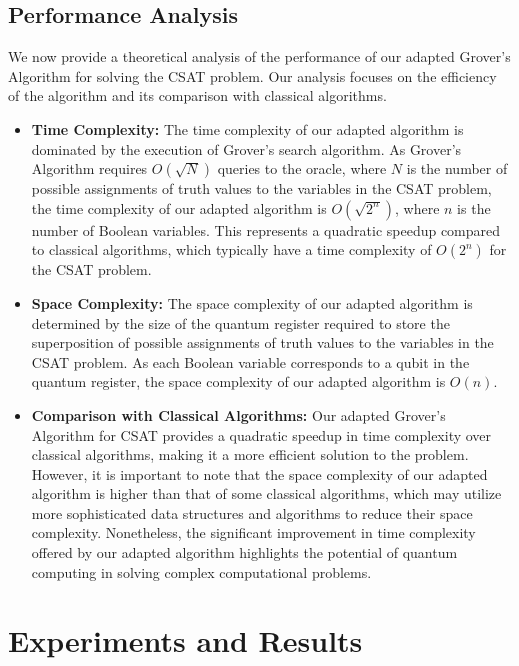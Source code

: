 \subsection{Performance Analysis}

We now provide a theoretical analysis of the performance of our adapted Grover's Algorithm for solving the CSAT problem. Our analysis focuses on the efficiency of the algorithm and its comparison with classical algorithms.

\begin{itemize}
    \item \textbf{Time Complexity:} The time complexity of our adapted algorithm is dominated by the execution of Grover's search algorithm. As Grover's Algorithm requires $O(\sqrt{N})$ queries to the oracle, where $N$ is the number of possible assignments of truth values to the variables in the CSAT problem, the time complexity of our adapted algorithm is $O(\sqrt{2^n})$, where $n$ is the number of Boolean variables. This represents a quadratic speedup compared to classical algorithms, which typically have a time complexity of $O(2^n)$ for the CSAT problem.
    
    \item \textbf{Space Complexity:} The space complexity of our adapted algorithm is determined by the size of the quantum register required to store the superposition of possible assignments of truth values to the variables in the CSAT problem. As each Boolean variable corresponds to a qubit in the quantum register, the space complexity of our adapted algorithm is $O(n)$.
    
    \item \textbf{Comparison with Classical Algorithms:} Our adapted Grover's Algorithm for CSAT provides a quadratic speedup in time complexity over classical algorithms, making it a more efficient solution to the problem. However, it is important to note that the space complexity of our adapted algorithm is higher than that of some classical algorithms, which may utilize more sophisticated data structures and algorithms to reduce their space complexity. Nonetheless, the significant improvement in time complexity offered by our adapted algorithm highlights the potential of quantum computing in solving complex computational problems.
\end{itemize}

\section{Experiments and Results}

